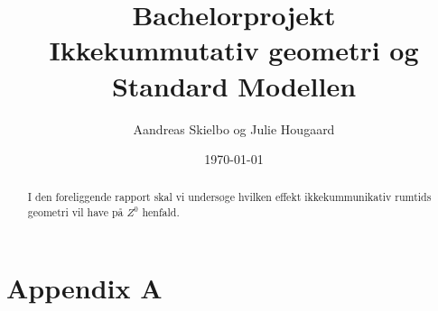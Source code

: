 \documentclass[11pt,a4paper,titlepage]{article}
\numberwithin{equation}{section}
\begin{document}
\title{Bachelorprojekt\\Ikkekummutativ geometri og Standard Modellen}
\author{Aandreas Skielbo og Julie Hougaard}
\date{\today}
\maketitle
{}

\begin{abstract}
I den foreliggende rapport skal vi undersøge hvilken effekt ikkekummunikativ rumtids geometri vil have på $Z^0$ henfald.
\end{abstract}

\clearpage
\tableofcontents
\clearpage

















\clearpage



\clearpage



\section{Appendix A}







\end{document}
